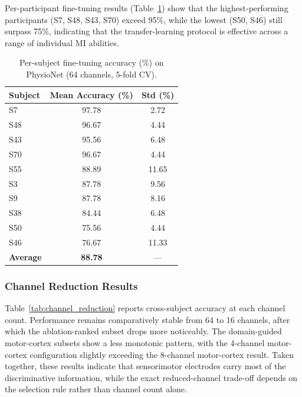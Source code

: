 \documentclass[12pt, a4paper]{article}
\begin{document}
Per-participant fine-tuning results (Table~\ref{tab:finetune_detail}) show that the highest-performing participants (S7, S48, S43, S70) exceed 95\%, while the lowest (S50, S46) still surpass 75\%, indicating that the transfer-learning protocol is effective across a range of individual MI abilities.

\begin{table}[htbp]
\centering
\caption{Per-subject fine-tuning accuracy (\%) on PhysioNet (64 channels, 5-fold CV).}
\label{tab:finetune_detail}
\begin{tabular}{lcc}
\toprule
\textbf{Subject} & \textbf{Mean Accuracy (\%)} & \textbf{Std (\%)} \\
\midrule
S7  & 97.78 & 2.72 \\
S48 & 96.67 & 4.44 \\
S43 & 95.56 & 6.48 \\
S70 & 96.67 & 4.44 \\
S55 & 88.89 & 11.65 \\
S3  & 87.78 & 9.56 \\
S9  & 87.78 & 8.16 \\
S38 & 84.44 & 6.48 \\
S50 & 75.56 & 4.44 \\
S46 & 76.67 & 11.33 \\
\midrule
\textbf{Average} & \textbf{88.78} & --- \\
\bottomrule
\end{tabular}
\end{table}

\subsubsection{Channel Reduction Results}

Table~\ref{tab:channel_reduction} reports cross-subject accuracy at each channel count. Performance remains comparatively stable from 64 to 16 channels, after which the ablation-ranked subset drops more noticeably. The domain-guided motor-cortex subsets show a less monotonic pattern, with the 4-channel motor-cortex configuration slightly exceeding the 8-channel motor-cortex result. Taken together, these results indicate that sensorimotor electrodes carry most of the discriminative information, while the exact reduced-channel trade-off depends on the selection rule rather than channel count alone.
\end{document}
